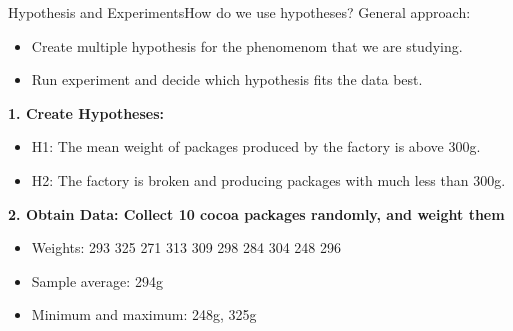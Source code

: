 \begin{frame}{Hypothesis and Experiments}{How do we use hypotheses?}
  General approach:
  \begin{itemize}
    \item Create multiple hypothesis for the phenomenom that we are studying.
    \item Run experiment and decide which hypothesis fits the data best.
  \end{itemize}\bigskip

  {\bf 1. Create Hypotheses:}
  \begin{itemize}
    \item H1: The mean weight of packages produced by the factory is above 300g.
    \item H2: The factory is broken and producing packages with much less than 300g.
  \end{itemize}\bigskip

  {\bf 2. Obtain Data: Collect 10 cocoa packages randomly, and weight them}
  \begin{itemize}
    \item Weights: 293 325 \alert{271} 313 309 298 284 304 \alert{248} 296
    \item Sample average: 294g\\
    \item Minimum and maximum: 248g, 325g\\
  \end{itemize}
\end{frame}



